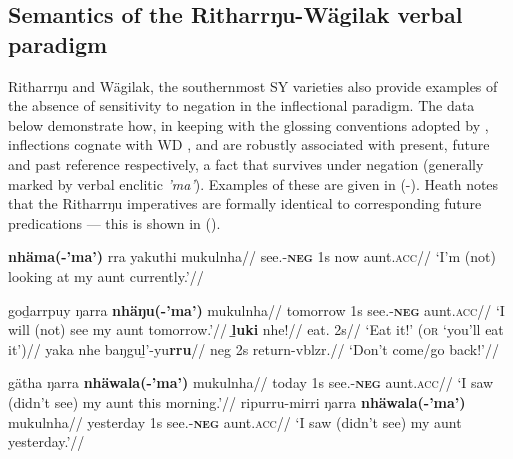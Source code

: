 \subsection{Semantics of the Ritharrŋu-Wägilak verbal paradigm}

Ritharrŋu and Wägilak, the southernmost SY varieties also provide examples of the absence of sensitivity to negation in the inflectional paradigm. The data below demonstrate how, in keeping with the glossing conventions adopted by \citet{Heath1980r}, inflections cognate with WD \I, \II{} and \III{} are robustly associated with present, future and past reference respectively, a fact that survives under negation (generally marked by verbal enclitic \textit{\textdblhyphen'ma'}). Examples of these are given in (-). Heath notes that the Ritharrŋu imperatives are formally identical to corresponding future predications \citeyearpar[76]{Heath1980r} --- this is shown in ().


\ex\begingl\gla {}\textbf{nhäma}{\textbf{(-'ma')}} rra yakuthi mukulnha//
\glb see.\textbf{{\I}}{-\textsc{\textbf{neg}}} 1s now aunt.\textsc{acc}//
\glft`I'm (not) looking at my aunt currently.'\trailingcitation{[RN~20190520]}//\endgl{}\xe

\pex\a\begingl\gla {}goḏarrpuy ŋarra \textbf{nhäŋu(-'ma')} mukulnha//
\glb tomorrow 1s see.\II-\textsc{\textbf{neg}} aunt.\textsc{acc}//
\glft`I will (not) see my aunt tomorrow.'\trailingcitation{[DW~20190522]}//\endgl
\a\begingl\gla \textbf{ḻuki} nhe!//
\glb eat.\II{} 2s//
\glft`Eat it!' (\textsc{or} `you'll eat it')//\endgl
\a\begingl\gla yaka nhe baŋguḻ'-yu\textbf{rru}//
\glb \gls{neg} 2s return-\gls{vblzr}.\II//
\glft`Don't come/go back!'//\endgl
\xe

\pex\a\begingl\gla {}gätha ŋarra \textbf{nhäwala}\textbf{(-'ma')} mukulnha//
\glb today 1s see.\textbf{\III}{-\textsc{\textbf{neg}}} aunt.\textsc{acc}//
\glft`I saw (didn't see) my aunt this morning.'\trailingcitation{[RN~20190522]}//\endgl
\a\begingl\gla {}ripurru-mirri ŋarra \textbf{nhäwala}{\textbf{(-'ma')}} mukulnha//
\glb yesterday 1s see.\textbf{\III}{-\textsc{\textbf{neg}}} aunt.\textsc{acc}//
\glft`I saw (didn't see) my aunt yesterday.'\trailingcitation{[RN~20190522]}//\endgl{}
\xe


